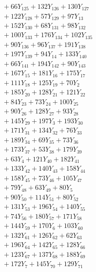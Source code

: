 \documentclass[a4paper,10pt]{article}
\begin{document}
{\begin{align}
&\quad  + 66Y_{125} + 132Y_{126} + 130Y_{127} \\[0.5ex]
&\quad  + 122Y_{128} + 57Y_{129} + 97Y_{13} \\[0.5ex]
&\quad  + 152Y_{130} + 68Y_{131} + 98Y_{132} \\[0.5ex]
&\quad  + 100Y_{133} + 176Y_{134} + 102Y_{135} \\[0.5ex]
&\quad  + 90Y_{136} + 96Y_{137} + 191Y_{138} \\[0.5ex]
&\quad  + 197Y_{139} + 94Y_{14} + 133Y_{140} \\[0.5ex]
&\quad  + 66Y_{141} + 194Y_{142} + 90Y_{143} \\[0.5ex]
&\quad  + 167Y_{15} + 181Y_{16} + 175Y_{17} \\[0.5ex]
&\quad  + 111Y_{18} + 125Y_{19} + 70Y_{2} \\[0.5ex]
&\quad  + 185Y_{20} + 128Y_{21} + 121Y_{22} \\[0.5ex]
&\quad  + 84Y_{23} + 73Y_{24} + 100Y_{25} \\[0.5ex]
&\quad  + 90Y_{26} + 128Y_{27} + 93Y_{28} \\[0.5ex]
&\quad  + 145Y_{29} + 197Y_{3} + 193Y_{30} \\[0.5ex]
&\quad  + 171Y_{31} + 134Y_{32} + 76Y_{33} \\[0.5ex]
&\quad  + 189Y_{34} + 69Y_{35} + 73Y_{36} \\[0.5ex]
&\quad  + 173Y_{37} + 53Y_{38} + 179Y_{39} \\[0.5ex]
&\quad  + 63Y_{4} + 121Y_{40} + 182Y_{41} \\[0.5ex]
&\quad  + 133Y_{42} + 140Y_{43} + 158Y_{44} \\[0.5ex]
&\quad  + 158Y_{45} + 73Y_{46} + 105Y_{47} \\[0.5ex]
&\quad  + 79Y_{48} + 63Y_{49} + 80Y_{5} \\[0.5ex]
&\quad  + 90Y_{50} + 114Y_{51} + 80Y_{52} \\[0.5ex]
&\quad  + 131Y_{53} + 196Y_{54} + 140Y_{55} \\[0.5ex]
&\quad  + 74Y_{56} + 180Y_{57} + 171Y_{58} \\[0.5ex]
&\quad  + 144Y_{59} + 170Y_{6} + 103Y_{60} \\[0.5ex]
&\quad  + 132Y_{61} + 126Y_{62} + 62Y_{63} \\[0.5ex]
&\quad  + 196Y_{64} + 142Y_{65} + 128Y_{66} \\[0.5ex]
&\quad  + 123Y_{67} + 137Y_{68} + 188Y_{69} \\[0.5ex]
&\quad  + 172Y_{7} + 145Y_{70} + 129Y_{71} \\[0.5ex]

\end{align}}
\end{document}
